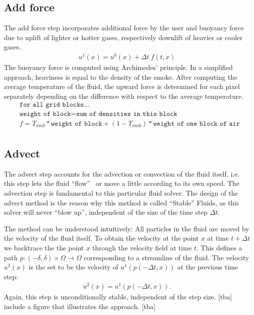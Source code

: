 \documentclass[a4paper,10pt,oneside,final,german,openbib,pdftex,titlepage]{scrbook}
\begin{document}
\subsection{Add force}
The add force step incorporates additional force by the user and buoyancy force due to uplift of lighter or hotter gases, respectively downlift of heavier or cooler gases.
\begin{align*}
	u^1(x) = u^0(x) + \Delta t~ f(t,x)
\end{align*}
The buoyancy force is computed using Archimedes' principle. In a simplified approach, heaviness is equal to the density of the smoke. After computing the average temperature of the fluid, the upward force is determined for each pixel separately depending on the difference with respect to the average temperature.
\begin{align*}
	&\texttt{for all grid blocks...}\\
	&\texttt{weight of block} = \texttt{sum of densities in this block}\\
	&f = T_{amb} * \texttt{weight of block} + (1-T_{amb}) * \texttt{weight of one block of air}\\
\end{align*}

\subsection{Advect}
The advect step accounts for the advection or convection of the fluid itself, i.e. this step lets the fluid ``flow'' ~or move a little according to its own speed.
The advection step is fundamental to this particular fluid solver. The design of the advect method is the reason why this method is called ``Stable'' Fluids, as this solver will never ``blow up'', independent of the size of the time step $\Delta t$. 

The method can be understood intuitively: All particles in the fluid are moved by the velocity of the fluid itself. To obtain the velocity at the point $x$ at time $t + \Delta t$ we backtrace the the point $x$ through the velocity field at time $t$. This defines a path $p: (-\delta,\delta) \times \Omega \rightarrow \Omega$ corresponding to a streamline of the fluid. The velocity $u^2(x)$ is the set to be the velocity of $u^1(p(-\Delta t,x))$ at the previous time step:
\begin{align*}
	u^2(x) = u^1(p(-\Delta t,x)).
\end{align*}
Again, this step is unconditionally stable, independent of the step size.
[tba] include a figure that illustrates the approach. [tba]
\end{document}
